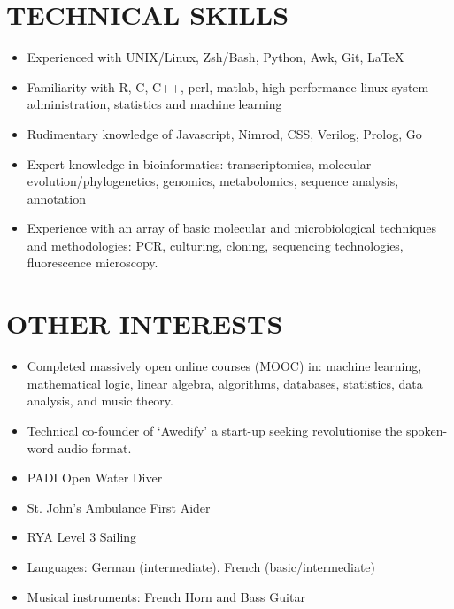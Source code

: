\documentclass{res}
\begin{document}
\begin{resume}
 \section{TECHNICAL SKILLS}
          \vspace{-1pt}
 \begin{itemize}
\item Experienced with UNIX/Linux, Zsh/Bash, Python, Awk, Git, \LaTeX
\item Familiarity with R, C, C++, perl, matlab, high-performance linux system administration, statistics and machine learning
\item Rudimentary knowledge of Javascript, Nimrod, CSS, Verilog, Prolog, Go
\item Expert knowledge in bioinformatics: transcriptomics, molecular evolution/phylogenetics, genomics, metabolomics, sequence analysis, annotation
\item Experience with an array of basic molecular and microbiological techniques and methodologies: PCR, culturing, cloning, sequencing technologies, fluorescence microscopy.
    \end{itemize}
	
 \section{OTHER INTERESTS}
          \vspace{-1pt}
 \begin{itemize}
     \item Completed massively open online courses (MOOC) in: machine learning, mathematical logic, linear algebra, algorithms, databases, statistics, data analysis, and music theory.
     \item Technical co-founder of `Awedify' a start-up seeking revolutionise the spoken-word audio format.
     \item PADI Open Water Diver
     \item St. John's Ambulance First Aider
     \item RYA Level 3 Sailing
     \item Languages: German (intermediate), French (basic/intermediate)
     \item Musical instruments: French Horn and Bass Guitar
 \end{itemize}
\end{resume}
\end{document}
